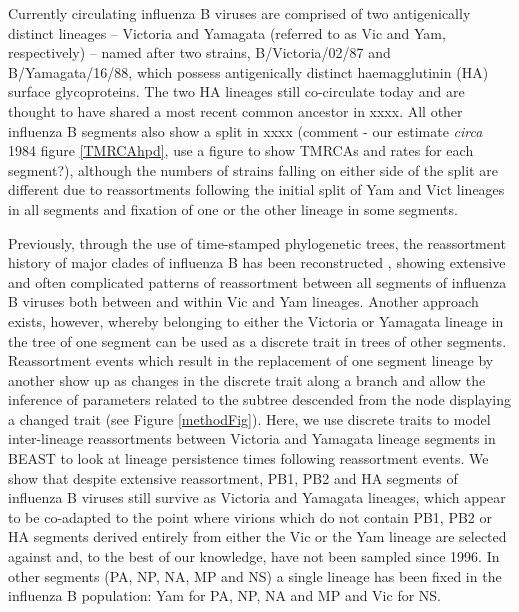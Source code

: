 \documentclass[11pt,oneside,letterpaper]{article}
\begin{document}
Currently circulating influenza B viruses are comprised of two antigenically distinct lineages -- Victoria and Yamagata (referred to as Vic and Yam, respectively) -- named after two strains, B/Victoria/02/87 and B/Yamagata/16/88, which possess antigenically distinct haemagglutinin (HA) surface glycoproteins. 
The two HA lineages still co-circulate today and are thought to have shared a most recent common ancestor in xxxx. 
All other influenza B segments also show a split in xxxx (comment - our estimate \textit{circa} 1984 figure \ref{TMRCAhpd}, use a figure to show TMRCAs and rates for each segment?), although the numbers of strains falling on either side of the split are different due to reassortments following the initial split of Yam and Vict lineages in all segments and fixation of one or the other lineage in some segments.


Previously, through the use of time-stamped phylogenetic trees, the reassortment history of major clades of influenza B has been reconstructed \cite{chen2008}, showing extensive and often complicated patterns of reassortment between all segments of influenza B viruses both between and within Vic and Yam lineages.
Another approach exists, however, whereby belonging to either the Victoria or Yamagata lineage in the tree of one segment can be used as a discrete trait in trees of other segments.
Reassortment events which result in the replacement of one segment lineage by another show up as changes in the discrete trait along a branch and allow the inference of parameters related to the subtree descended from the node displaying a changed trait (see Figure \ref{methodFig}).
Here, we use discrete traits to model inter-lineage reassortments between Victoria and Yamagata lineage segments in BEAST to look at lineage persistence times following reassortment events. 
We show that despite extensive reassortment, PB1, PB2 and HA segments of influenza B viruses still survive as Victoria and Yamagata lineages, which appear to be co-adapted to the point where virions which do not contain PB1, PB2 or HA segments derived entirely from either the Vic or the Yam lineage are selected against and, to the best of our knowledge, have not been sampled since 1996.
In other segments (PA, NP, NA, MP and NS) a single lineage has been fixed in the influenza B population: Yam for PA, NP, NA and MP and Vic for NS.
\end{document}

